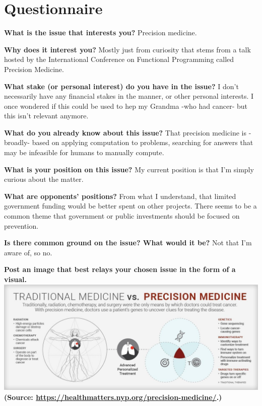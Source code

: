 \section*{Questionnaire}

\noindent\textbf{What is the issue that interests you?}
\newline\hspace{10mm}Precision medicine.

\noindent\textbf{Why does it interest you?}
\newline\hspace{10mm}Mostly just from curiosity that stems  from a talk hosted by the International Conference on Functional Programming called Precision Medicine.

\noindent\textbf{What stake (or personal interest) do you have in the issue?}
\newline\hspace{10mm}I don’t necessarily have any financial stakes in the manner, or other personal interests. I once wondered if this could be used to hep my Grandma -who had cancer- but this isn’t relevant anymore.

\noindent\textbf{What do you already know about this issue?}
\newline\hspace{10mm}That precision medicine is -broadly- based on applying computation to problems, searching for answers that may be infeasible for humans to manually compute.

\noindent\textbf{What is your position on this issue?}
\newline\hspace{10mm}My current position is that I’m simply curious about the matter.

\noindent\textbf{What are opponents’ positions?}
\newline\hspace{10mm}From what I understand, that limited government funding would be better spent on other projects. There seems to be a common theme that government or public investments should be focused on prevention.

\noindent\textbf{Is there common ground on the issue? What would it be?}
\newline\hspace{10mm}Not that I’m aware of, so no.

\noindent\textbf{Post an image that best relays your chosen issue in the form of a visual.}\newline
\includegraphics[scale=0.4]{../assets/infographic1.jpg}
\textbf{(Source: \url{https://healthmatters.nyp.org/precision-medicine/}.)}

